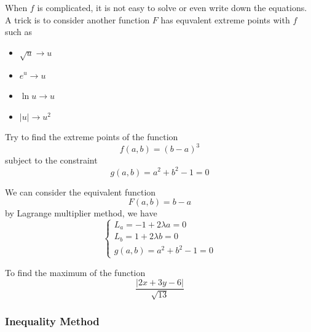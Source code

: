 \documentclass[a4]{overview}
\begin{document}
When $f$ is complicated, it is not easy to solve or even write down the equations.
A trick is to consider another function $F$ has equvalent extreme points with $f$
such as
\begin{itemize}
	\item $\sqrt{u}\rightarrow u$
	\item $e^u\rightarrow u$
	\item $\ln u\rightarrow u$
	\item $|u|\rightarrow u^2$
\end{itemize}

\begin{example}
	Try to find the extreme points of the function
	\[
	f(a, b) = (b-a)^3
\]
	subject to the constraint
	\[
	g(a, b) = a^2 + b^2 - 1 = 0
	\] 
	\begin{answer}
		We can consider the equivalent function
		\[
		F(a, b) = b-a
		\] 
		by Lagrange multiplier method, we have
		\[
		\begin{cases}
			L_a = -1 + 2\lambda a = 0\\
			L_b = 1 + 2\lambda b = 0\\
			g(a, b) = a^2 + b^2 - 1 = 0
		\end{cases}
	\]
	\end{answer}
\end{example}

\begin{example}
	To find the maximum of the function
	\[
		\frac{|2x+3y-6|}{\sqrt{13}}
	\] 

\end{example}

\subsubsection{Inequality Method}
\end{document}
